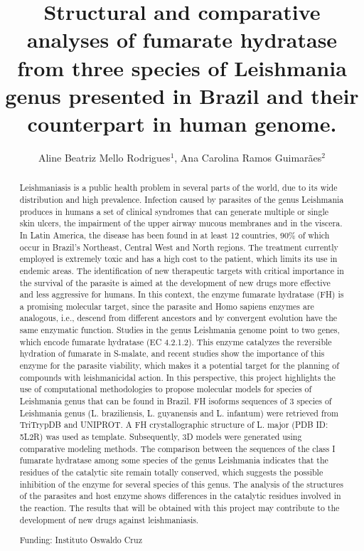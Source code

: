 \documentclass[twoside]{article}
\title{\vspace{-15mm}\fontsize{24pt}{10pt}\selectfont\textbf{Structural and comparative analyses of fumarate hydratase from three species of Leishmania genus presented in Brazil and their counterpart in human genome.}} %
\author{Aline Beatriz Mello Rodrigues$^1$, Ana Carolina Ramos Guimar\~aes$^2$}
\affil{1 INSTITUTO OSWALDO CRUZ\\ 2 FIOCRUZ-IOC\\ }
\date{}
\begin{document}
\maketitle %

\thispagestyle{fancy} %


\begin{abstract}
Leishmaniasis is a public health problem in several parts of the world, due to its wide distribution and high prevalence. Infection caused by parasites of the genus Leishmania produces in humans a set of clinical syndromes that can generate multiple or single skin ulcers, the impairment of the upper airway mucous membranes and in the viscera. In Latin America, the disease has been found in at least 12 countries, 90\% of which occur in Brazil's Northeast, Central West and North regions. The treatment currently employed is extremely toxic and has a high cost to the patient, which limits its use in endemic areas. The identification of new therapeutic targets with critical importance in the survival of the parasite is aimed at the development of new drugs more effective and less aggressive for humans. In this context, the enzyme fumarate hydratase (FH) is a promising molecular target, since the parasite and Homo sapiens enzymes are analogous, i.e., descend from different ancestors and by convergent evolution have the same enzymatic function. Studies in the genus Leishmania genome point to two genes, which encode fumarate hydratase (EC 4.2.1.2). This enzyme catalyzes the reversible hydration of fumarate in S-malate, and recent studies show the importance of this enzyme for the parasite viability, which makes it a potential target for the planning of compounds with leishmanicidal action. In this perspective, this project highlights the use of computational methodologies to propose molecular models for species of Leishmania genus that can be found in Brazil. FH isoforms sequences of 3 species of Leishmania genus (L. braziliensis, L. guyanensis and L. infantum) were retrieved from TriTrypDB and UNIPROT. A FH crystallographic structure of L. major (PDB ID: 5L2R) was used as template. Subsequently, 3D models were generated using comparative modeling methods. The comparison between the sequences of the class I fumarate hydratase among some species of the genus Leishmania indicates that the residues of the catalytic site remain totally conserved, which suggests the possible inhibition of the enzyme for several species of this genus. The analysis of the structures of the parasites and host enzyme shows differences in the catalytic residues involved in the reaction. The results that will be obtained with this project may contribute to the development of new drugs against leishmaniasis.

Funding: Instituto Oswaldo Cruz
\end{abstract}
\end{document}
